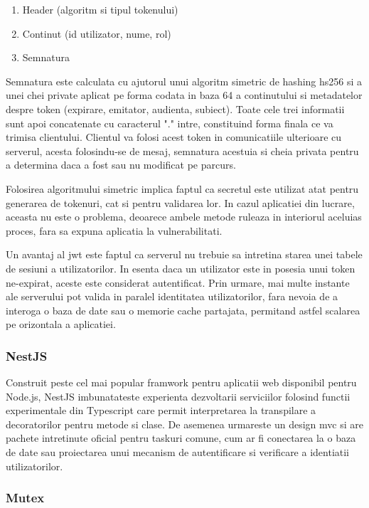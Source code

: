 \begin{enumerate}
  \item Header (algoritm si tipul tokenului)
  \item Continut (id utilizator, nume, rol)
  \item Semnatura
\end{enumerate}

Semnatura este calculata cu ajutorul unui algoritm simetric de hashing \acrfull{hs256} si a unei chei private aplicat pe forma codata in baza 64 a continutului si metadatelor despre token (expirare, emitator, audienta, subiect). Toate cele trei informatii sunt apoi concatenate cu caracterul "." intre, constituind forma finala ce va trimisa clientului. Clientul va folosi acest token in comunicatiile ulterioare cu serverul, acesta folosindu-se de mesaj, semnatura acestuia si cheia privata pentru a determina daca a fost sau nu modificat pe parcurs.

Folosirea algoritmului simetric implica faptul ca secretul este utilizat atat pentru generarea de tokenuri, cat si pentru validarea lor. In cazul aplicatiei din lucrare, aceasta nu este o problema, deoarece ambele metode ruleaza in interiorul aceluias proces, fara sa expuna aplicatia la vulnerabilitati.

Un avantaj al \acrshort{jwt} este faptul ca serverul nu trebuie sa intretina starea unei tabele de sesiuni a utilizatorilor. In esenta daca un utilizator este in posesia unui token ne-expirat, aceste este considerat autentificat. Prin urmare, mai multe instante ale serverului pot valida in paralel identitatea utilizatorilor, fara nevoia de a interoga o baza de date sau o memorie cache partajata, permitand astfel scalarea pe orizontala a aplicatiei.

\subsubsection {NestJS}

Construit peste cel mai popular framwork pentru aplicatii web disponibil pentru Node.js, NestJS imbunatateste experienta dezvoltarii serviciilor folosind functii experimentale din Typescript care permit interpretarea la transpilare a decoratorilor pentru metode si clase. De asemenea urmareste un design \acrshort{mvc} si are pachete intretinute oficial pentru taskuri comune, cum ar fi conectarea la o baza de date sau proiectarea unui mecanism de autentificare si verificare a identiatii utilizatorilor.

\subsubsection {Mutex}

